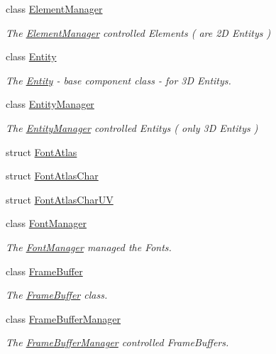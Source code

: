 \begin{DoxyCompactItemize}
class \hyperlink{classEngine_1_1ElementManager}{Element\+Manager}
\begin{DoxyCompactList}\small\item\em The \hyperlink{classEngine_1_1ElementManager}{Element\+Manager} controlled Elements ( are 2\+D Entitys ) \end{DoxyCompactList}\item 
class \hyperlink{classEngine_1_1Entity}{Entity}
\begin{DoxyCompactList}\small\item\em The \hyperlink{classEngine_1_1Entity}{Entity} -\/ base component class -\/ for 3\+D Entitys. \end{DoxyCompactList}\item 
class \hyperlink{classEngine_1_1EntityManager}{Entity\+Manager}
\begin{DoxyCompactList}\small\item\em The \hyperlink{classEngine_1_1EntityManager}{Entity\+Manager} controlled Entitys ( only 3\+D Entitys ) \end{DoxyCompactList}\item 
struct \hyperlink{structEngine_1_1FontAtlas}{Font\+Atlas}
\item 
struct \hyperlink{structEngine_1_1FontAtlasChar}{Font\+Atlas\+Char}
\item 
struct \hyperlink{structEngine_1_1FontAtlasCharUV}{Font\+Atlas\+Char\+U\+V}
\item 
class \hyperlink{classEngine_1_1FontManager}{Font\+Manager}
\begin{DoxyCompactList}\small\item\em The \hyperlink{classEngine_1_1FontManager}{Font\+Manager} managed the Fonts. \end{DoxyCompactList}\item 
class \hyperlink{classEngine_1_1FrameBuffer}{Frame\+Buffer}
\begin{DoxyCompactList}\small\item\em The \hyperlink{classEngine_1_1FrameBuffer}{Frame\+Buffer} class. \end{DoxyCompactList}\item 
class \hyperlink{classEngine_1_1FrameBufferManager}{Frame\+Buffer\+Manager}
\begin{DoxyCompactList}\small\item\em The \hyperlink{classEngine_1_1FrameBufferManager}{Frame\+Buffer\+Manager} controlled Frame\+Buffers. \end{DoxyCompactList}\item 

\end{DoxyCompactItemize}
